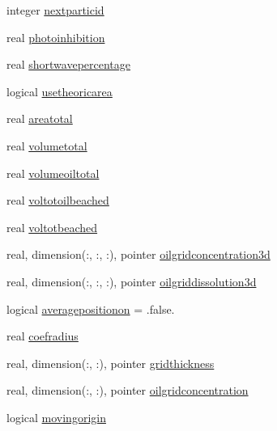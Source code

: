 \begin{DoxyCompactItemize}
integer \mbox{\hyperlink{structmodulelagrangian_1_1t__origin_a457bac5e77874939714402869792861b}{nextparticid}}
\item 
real \mbox{\hyperlink{structmodulelagrangian_1_1t__origin_a994fc81e22f0d20359269aab0fb98dfa}{photoinhibition}}
\item 
real \mbox{\hyperlink{structmodulelagrangian_1_1t__origin_a08ef49a5a770a9ba5fe23ae9467b7b3c}{shortwavepercentage}}
\item 
logical \mbox{\hyperlink{structmodulelagrangian_1_1t__origin_adbd8a61501ae54bee8766da3b21bdea5}{usetheoricarea}}
\item 
real \mbox{\hyperlink{structmodulelagrangian_1_1t__origin_a6ad35edf8957a8173da761df1027268a}{areatotal}}
\item 
real \mbox{\hyperlink{structmodulelagrangian_1_1t__origin_a11f1cfa9a44d88ee9916126293ace3d4}{volumetotal}}
\item 
real \mbox{\hyperlink{structmodulelagrangian_1_1t__origin_a72112bc7249a996b110e7a9190a789e9}{volumeoiltotal}}
\item 
real \mbox{\hyperlink{structmodulelagrangian_1_1t__origin_aca7bb8fb86e1df4e9a264d0fa22880ca}{voltotoilbeached}}
\item 
real \mbox{\hyperlink{structmodulelagrangian_1_1t__origin_a668736b5574bbd49ab15d25305d693fe}{voltotbeached}}
\item 
real, dimension(\+:, \+:, \+:), pointer \mbox{\hyperlink{structmodulelagrangian_1_1t__origin_aeeb353b4bd712a39247e87d1b77f0424}{oilgridconcentration3d}}
\item 
real, dimension(\+:, \+:, \+:), pointer \mbox{\hyperlink{structmodulelagrangian_1_1t__origin_a9d65765083a1dab86721ae64e0729095}{oilgriddissolution3d}}
\item 
logical \mbox{\hyperlink{structmodulelagrangian_1_1t__origin_a65a7955455659080675588171889ddc1}{averagepositionon}} = .false.
\item 
real \mbox{\hyperlink{structmodulelagrangian_1_1t__origin_a236cd59d531a308e11fc32005429a788}{coefradius}}
\item 
real, dimension(\+:, \+:), pointer \mbox{\hyperlink{structmodulelagrangian_1_1t__origin_a8e98553ed49d7b4fa770c277e28d1473}{gridthickness}}
\item 
real, dimension(\+:, \+:), pointer \mbox{\hyperlink{structmodulelagrangian_1_1t__origin_a79dc3657aa3af941fd54eb9aad0b6a02}{oilgridconcentration}}
\item 
logical \mbox{\hyperlink{structmodulelagrangian_1_1t__origin_a3dbe28b8a0aaaba9976a1d06f12bc19e}{movingorigin}}

\end{DoxyCompactItemize}
